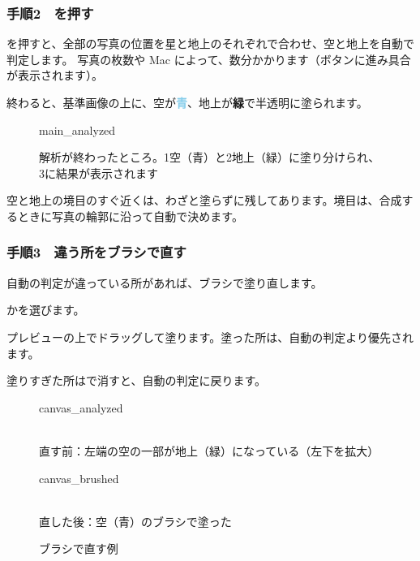 \subsubsection*{手順2　を押す}

を押すと、全部の写真の位置を星と地上のそれぞれで合わせ、空と地上を自動で判定します。
写真の枚数や Mac によって、数分かかります（ボタンに進み具合が表示されます）。

終わると、基準画像の上に、空が\textcolor{skyblue}{\textbf{青}}、地上が\textcolor{groundgreen}{\textbf{緑}}で半透明に塗られます。

\begin{figure}[H]
\centering
\begin{screenshot}{main_analyzed}
\end{screenshot}
\caption{解析が終わったところ。\num{1}空（青）と\num{2}地上（緑）に塗り分けられ、\num{3}に結果が表示されます}
\end{figure}

\begin{memo}[境目は塗られていません]
空と地上の境目のすぐ近くは、わざと塗らずに残してあります。境目は、合成するときに写真の輪郭に沿って自動で決めます。
\end{memo}

\subsubsection*{手順3　違う所をブラシで直す}

自動の判定が違っている所があれば、ブラシで塗り直します。
\begin{steps}
  \item {}かを選びます。
  \item プレビューの上でドラッグして塗ります。塗った所は、自動の判定より優先されます。
  \item 塗りすぎた所はで消すと、自動の判定に戻ります。
\end{steps}

\begin{figure}[H]
\centering
\begin{minipage}[t]{0.49\linewidth}\centering
\begin{screenshot}{canvas_analyzed}
\end{screenshot}\\[0.3ex]{\small 直す前：左端の空の一部が地上（緑）になっている（左下を拡大）}
\end{minipage}\hfill
\begin{minipage}[t]{0.49\linewidth}\centering
\begin{screenshot}{canvas_brushed}
\end{screenshot}\\[0.3ex]{\small 直した後：空（青）のブラシで塗った}
\end{minipage}
\caption{ブラシで直す例}
\end{figure}

